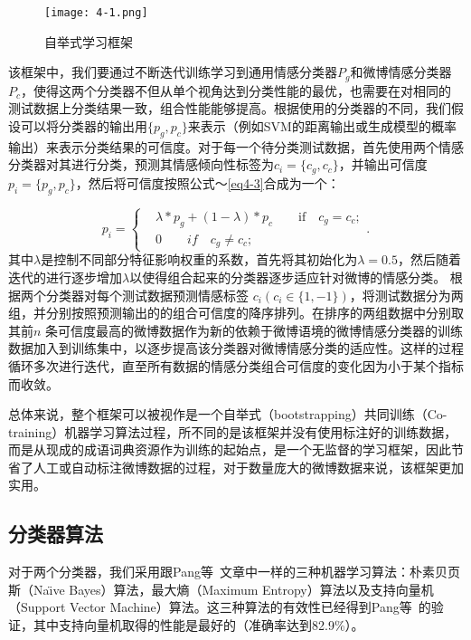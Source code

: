 \begin{landscape}
\begin{figure*}[htp] 
\centering%
\texttt{[image: 4-1.png]}
\caption{自举式学习框架}
\label{fig4-1}
\end{figure*}
\end{landscape}
该框架中，我们要通过不断迭代训练学习到通用情感分类器$ P_{g} $和微博情感分类器$ P_{c} $，使得这两个分类器不但从单个视角达到分类性能的最优，也需要在对相同的测试数据上分类结果一致，组合性能能够提高。根据使用的分类器的不同，我们假设可以将分类器的输出用$  \lbrace p_{g},p_{c}\rbrace$来表示（例如SVM的距离输出或生成模型的概率输出）来表示分类结果的可信度。对于每一个待分类测试数据，首先使用两个情感分类器对其进行分类，预测其情感倾向性标签为$ c_{i}=\lbrace c_{g},c_{c}\rbrace $，并输出可信度$ p_{i}= \lbrace p_{g},p_{c}\rbrace$，然后将可信度按照公式～\ref{eq4-3}合成为一个：

\begin{equation}
\label{eq4-3}
p_{i}=\begin{cases}
& \lambda\ast p_{g} + \left( 1-\lambda \right) \ast p_{c} \qquad \mbox{if} \quad c_{g}=c_{c};\\
& 0 \qquad \textit{if} \quad c_{g} \neq c_{c};
\end{cases}.
\end{equation}
其中$ \lambda $是控制不同部分特征影响权重的系数，首先将其初始化为$ \lambda = 0.5 $，然后随着迭代的进行逐步增加$ \lambda $以使得组合起来的分类器逐步适应针对微博的情感分类。
根据两个分类器对每个测试数据预测情感标签 $ c_{i} \left( c_{i} \in \lbrace 1, -1\rbrace \right)$，将测试数据分为两组，并分别按照预测输出的的组合可信度的降序排列。在排序的两组数据中分别取其前$ n $ 条可信度最高的微博数据作为新的依赖于微博语境的微博情感分类器的训练数据加入到训练集中，以逐步提高该分类器对微博情感分类的适应性。这样的过程循环多次进行迭代，直至所有数据的情感分类组合可信度的变化因为小于某个指标而收敛。

总体来说，整个框架可以被视作是一个自举式（bootstrapping）共同训练（Co-training）机器学习算法过程，所不同的是该框架并没有使用标注好的训练数据，而是从现成的成语词典资源作为训练的起始点，是一个无监督的学习框架，因此节省了人工或自动标注微博数据的过程，对于数量庞大的微博数据来说，该框架更加实用。

\subsection{分类器算法}
\label{classifier}
对于两个分类器，我们采用跟Pang等~文章中一样的三种机器学习算法：朴素贝页斯（Na\"\i ve Bayes）算法，最大熵（Maximum Entropy）算法以及支持向量机（Support Vector Machine）算法。这三种算法的有效性已经得到Pang等~的验证，其中支持向量机取得的性能是最好的（准确率达到82.9\%）。

